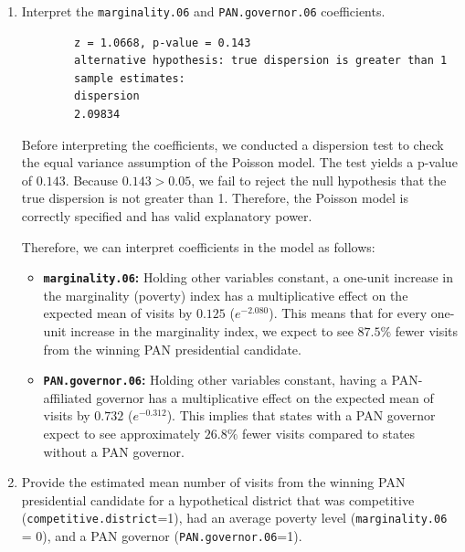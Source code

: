 \documentclass[12pt,letterpaper]{article}
\begin{document}
\begin{enumerate}
	\vspace{0.4cm}
	
	\item [(b)]
	Interpret the \texttt{marginality.06} and \texttt{PAN.governor.06} coefficients.
	
	\vspace{0.2cm}
	
	 
	\begin{verbatim}
		z = 1.0668, p-value = 0.143
		alternative hypothesis: true dispersion is greater than 1
		sample estimates:
		dispersion 
		2.09834 
	\end{verbatim}
	
	\vspace{0.2cm}
	
	Before interpreting the coefficients, we conducted a dispersion test to check the equal variance assumption of the Poisson model. The test yields a p-value of $0.143$. Because $0.143 > 0.05$, we fail to reject the null hypothesis that the true dispersion is not greater than 1. Therefore, the Poisson model is correctly specified and has valid explanatory power.
	
	Therefore, we can interpret coefficients in the model as follows:
	
	\begin{itemize}
		\setlength{\itemsep}{0.2cm}
		\item \textbf{\texttt{marginality.06}:} Holding other variables constant, a one-unit increase in the marginality (poverty) index has a multiplicative effect on the expected mean of visits by $0.125$ ($e^{-2.080}$). This means that for every one-unit increase in the marginality index, we expect to see $87.5\%$ fewer visits from the winning PAN presidential candidate.
		\item \textbf{\texttt{PAN.governor.06}:} Holding other variables constant, having a PAN-affiliated governor has a multiplicative effect on the expected mean of visits by $0.732$ ($e^{-0.312}$). This implies that states with a PAN governor expect to see approximately $26.8\%$ fewer visits compared to states without a PAN governor.
	\end{itemize}
	
	\vspace{0.4cm}
	
	\item [(c)]
	Provide the estimated mean number of visits from the winning PAN presidential candidate for a hypothetical district that was competitive (\texttt{competitive.district}=1), had an average poverty level (\texttt{marginality.06} = 0), and a PAN governor (\texttt{PAN.governor.06}=1).
	

\end{enumerate}
\end{document}

